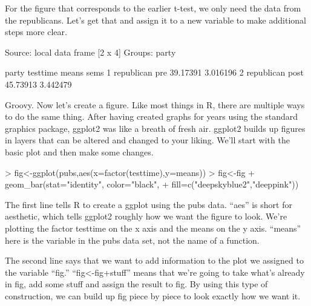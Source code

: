 \documentclass[12pt]{article}
\begin{document}
For the figure that corresponds to the earlier t-test, we only need the data from the
republicans. Let's get that and assign it to a new variable to make additional steps
more clear.

\begin{Schunk}
\begin{Soutput}
Source: local data frame [2 x 4]
Groups: party

       party testtime    means     sems
1 republican      pre 39.17391 3.016196
2 republican     post 45.73913 3.442479
\end{Soutput}
\end{Schunk}

Groovy. Now let's create a figure. Like most things in R, there are multiple ways to
do the same thing. After having created graphs for years using the standard graphics
package, ggplot2 was like a breath of fresh air. ggplot2 builds up figures in layers
that can be altered and changed to your liking. We'll start with the basic plot and
then make some changes.

\begin{Schunk}
\begin{Sinput}
> fig<-ggplot(pubs,aes(x=factor(testtime),y=means))
> fig<-fig + geom_bar(stat="identity", color="black",
+                     fill=c("deepskyblue2","deeppink"))
\end{Sinput}
\end{Schunk}

The first line tells R to create a ggplot using the pubs data. ``aes'' is short for aesthetic,
which tells ggplot2 roughly how we want the figure to look. We're plotting the factor
testtime on the x axis and the means on the y axis. ``means'' here is the variable in the
pubs data set, not the name of a function.

The second line says that we want to add information to the plot we assigned to the variable
``fig.'' ``fig<-fig+stuff'' means that we're going to take what's already in fig, add some
stuff and assign the result to fig. By using this type of construction, we can build up
fig piece by piece to look exactly how we want it.
\end{document}
